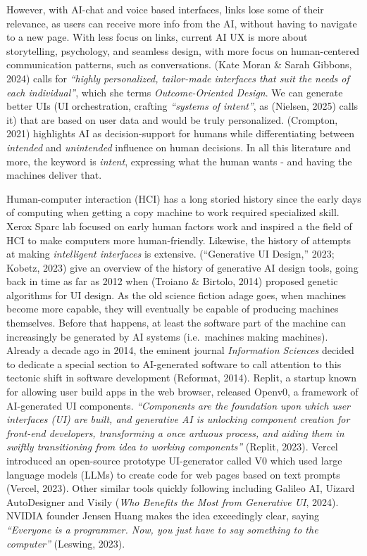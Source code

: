 \documentclass[
  letterpaper,
  DIV=11,
  numbers=noendperiod]{scrartcl}
\begin{document}
However, with AI-chat and voice based interfaces, links lose some of
their relevance, as users can receive more info from the AI, without
having to navigate to a new page. With less focus on links, current AI
UX is more about storytelling, psychology, and seamless design, with
more focus on human-centered communication patterns, such as
conversations. (Kate Moran \& Sarah Gibbons, 2024) calls for
\emph{``highly personalized, tailor-made interfaces that suit the needs
of each individual''}, which she terms \emph{Outcome-Oriented Design}.
We can generate better UIs (UI orchestration, crafting \emph{``systems
of intent''}, as (Nielsen, 2025) calls it) that are based on user data
and would be truly personalized. (Crompton, 2021) highlights AI as
decision-support for humans while differentiating between
\emph{intended} and \emph{unintended} influence on human decisions. In
all this literature and more, the keyword is \emph{intent}, expressing
what the human wants - and having the machines deliver that.

Human-computer interaction (HCI) has a long storied history since the
early days of computing when getting a copy machine to work required
specialized skill. Xerox Sparc lab focused on early human factors work
and inspired a the field of HCI to make computers more human-friendly.
Likewise, the history of attempts at making \emph{intelligent
interfaces} is extensive. ({``Generative {UI Design},''} 2023; Kobetz,
2023) give an overview of the history of generative AI design tools,
going back in time as far as 2012 when (Troiano \& Birtolo, 2014)
proposed genetic algorithms for UI design. As the old science fiction
adage goes, when machines become more capable, they will eventually be
capable of producing machines themselves. Before that happens, at least
the software part of the machine can increasingly be generated by AI
systems (i.e.~machines making machines). Already a decade ago in 2014,
the eminent journal \emph{Information Sciences} decided to dedicate a
special section to AI-generated software to call attention to this
tectonic shift in software development (Reformat, 2014). Replit, a
startup known for allowing user build apps in the web browser, released
Openv0, a framework of AI-generated UI components. \emph{``Components
are the foundation upon which user interfaces (UI) are built, and
generative AI is unlocking component creation for front-end developers,
transforming a once arduous process, and aiding them in swiftly
transitioning from idea to working components''} (Replit, 2023). Vercel
introduced an open-source prototype UI-generator called V0 which used
large language models (LLMs) to create code for web pages based on text
prompts (Vercel, 2023). Other similar tools quickly following including
Galileo AI, Uizard AutoDesigner and Visily (\emph{Who {Benefits} the
Most from {Generative UI}}, 2024). NVIDIA founder Jensen Huang makes the
idea exceedingly clear, saying \emph{``Everyone is a programmer. Now,
you just have to say something to the computer''} (Leswing, 2023).
\end{document}
